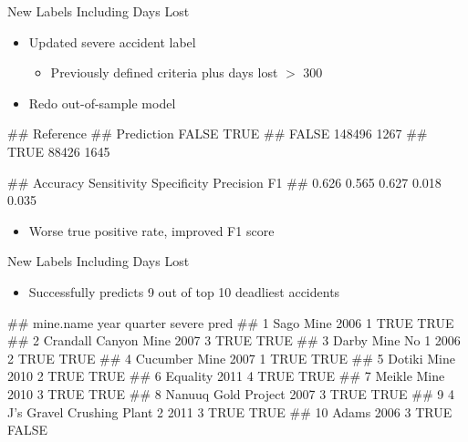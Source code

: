\documentclass[
]{beamer}
\providecommand{\tightlist}{%
  \setlength{\itemsep}{0pt}\setlength{\parskip}{0pt}}
\let\oldverbatim\verbatim
\let\endoldverbatim\endverbatim
\renewenvironment{verbatim}{\footnotesize\oldverbatim}{\endoldverbatim}
\begin{document}
\begin{frame}[fragile]{New Labels Including Days Lost}

\begin{itemize}
\tightlist
\item
  Updated severe accident label

  \begin{itemize}
  \tightlist
  \item
    Previously defined criteria plus days lost \(>\) 300
  \end{itemize}
\item
  Redo out-of-sample model
\end{itemize}

\begin{verbatim}
##           Reference
## Prediction  FALSE   TRUE
##      FALSE 148496   1267
##      TRUE   88426   1645
\end{verbatim}

\begin{verbatim}
##    Accuracy Sensitivity Specificity   Precision          F1 
##       0.626       0.565       0.627       0.018       0.035
\end{verbatim}

\begin{itemize}
\tightlist
\item
  Worse true positive rate, improved F1 score
\end{itemize}

\end{frame}

\begin{frame}[fragile]{New Labels Including Days Lost}

\begin{itemize}
\tightlist
\item
  Successfully predicts 9 out of top 10 deadliest accidents
\end{itemize}

\begin{verbatim}
##                        mine.name year quarter severe  pred
## 1                      Sago Mine 2006       1   TRUE  TRUE
## 2           Crandall Canyon Mine 2007       3   TRUE  TRUE
## 3                Darby Mine No 1 2006       2   TRUE  TRUE
## 4                  Cucumber Mine 2007       1   TRUE  TRUE
## 5                    Dotiki Mine 2010       2   TRUE  TRUE
## 6                       Equality 2011       4   TRUE  TRUE
## 7                    Meikle Mine 2010       3   TRUE  TRUE
## 8            Nanuuq Gold Project 2007       3   TRUE  TRUE
## 9  4 J's Gravel Crushing Plant 2 2011       3   TRUE  TRUE
## 10                         Adams 2006       3   TRUE FALSE
\end{verbatim}

\end{frame}
\end{document}
